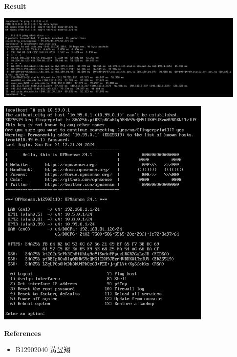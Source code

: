 \documentclass[12pt, a4paper]{article}
\begin{document}
\begin{enumerate}[resume]
    \clearpage
    \textbf{Result}

    \includegraphics[width=0.93\textwidth]{8_ping_traceroute.png}

    \includegraphics[width=0.8\textwidth]{8_ssh.png}

    \textbf{References}
    \begin{itemize}
      \item B12902040 黃昱翔
    \end{itemize}


\end{enumerate}
\end{document}
